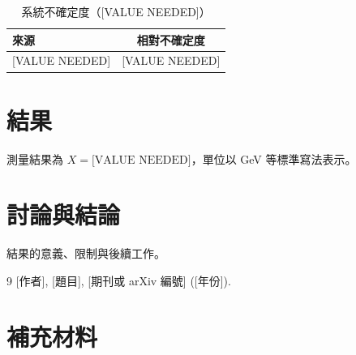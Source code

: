 \documentclass[a4paper, zihao = -4, openany]{ctexbook}
\begin{document}
\begin{table}[htbp]
  \centering
  \caption{系統不確定度（[VALUE NEEDED]）}
  \label{tab:syst}
  \begin{tabular}{lc}
    \toprule
    來源 & 相對不確定度 \\
    \midrule
    {[VALUE NEEDED]} & {[VALUE NEEDED]} \\
    \bottomrule
  \end{tabular}
\end{table}

\chapter{結果}
測量結果為 $X = \text{[VALUE NEEDED]}$，單位以 \si{\giga\electronvolt} 等標準寫法表示。

\chapter{討論與結論}
結果的意義、限制與後續工作。

\backmatter
\begin{thebibliography}{9}
 [作者], [題目], [期刊或 arXiv 編號] ([年份]).
\end{thebibliography}

\appendix
\chapter{補充材料}
\end{document}

